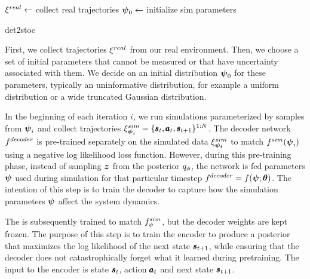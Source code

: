 \vspace{\baselineskip}%
\begin{algorithm}[H]
  \DontPrintSemicolon
  $\xi^{real} \leftarrow$ collect real trajectories \; \label{det2stoc:step1}
  $\boldsymbol{\psi}_0 \leftarrow$ initialize sim parameters \;
  \caption{det2stoc}
  \label{alg:det2stoc}
\end{algorithm}
\vspace{\baselineskip}%
First, we collect trajectories $\xi^{real}$ from our real environment.
Then, we choose a set of initial parameters that cannot be measured or that have uncertainty associated with them. We decide on an initial distribution $\boldsymbol{\psi}_0$ for these parameters, typically an uninformative distribution, for example a uniform distribution or a wide truncated Gaussian distribution.

In the beginning of each iteration $i$, we run simulations parameterized by samples from $\boldsymbol{\psi}_i$ and collect trajectories $\xi^{sim}_{\boldsymbol{\psi}_i}=\{\pmb{s}_t, \pmb{a}_t, \pmb{s}_{t+1}\}^{1:N}$. The decoder network $f^{decoder}{}$ is pre-trained separately on the simulated data $\xi^{sim}_{\boldsymbol{\psi_i}}{}$ to match $f^{sim}(\boldsymbol{\psi}_i)$ using a negative log likelihood loss function. However, during this pre-training phase, instead of sampling $\boldsymbol{z}$ from the posterior $q_{\phi}$, the network is fed parameters $\boldsymbol{\psi}$ used during simulation for that particular timestep $f^{decoder} = f(\boldsymbol{\psi}; \boldsymbol{\theta})$. The intention of this step is to train the decoder to capture how the simulation parameters $\boldsymbol{\psi}$ affect the system dynamics.%

The \cvae{} is subsequently trained to match $f^{sim}_{\psi}{}$, but the decoder weights are kept frozen. The purpose of this step is to train the encoder to produce a posterior that maximizes the log likelihood of the next state $\pmb{s}_{t+1}$, while ensuring that the decoder does not catastrophically forget \parencite{French2006CatastrophicFI} what it learned during pretraining. The input to the encoder is state $\pmb{s}_t$, action $\pmb{a}_t$ and next state $\pmb{s}_{t+1}$. %

